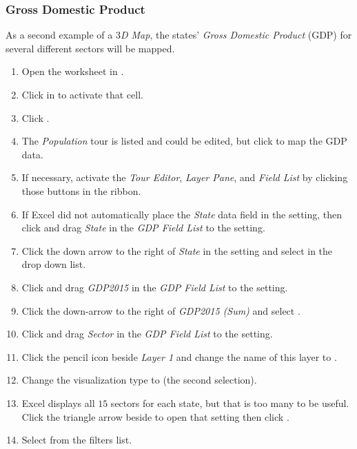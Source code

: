 \subsubsection{Gross Domestic Product}

As a second example of a \textit{$ 3 $D Map}, the states' \textit{Gross Domestic Product} (GDP) for several different sectors will be mapped.

\begin{enumerate}
	\item Open the  worksheet in .
	\item Click in  to activate that cell.
	\item Click .
	\item The \textit{Population} tour is listed and could be edited, but click  to map the GDP data.
	\item If necessary, activate the \textit{Tour Editor}, \textit{Layer Pane}, and \textit{Field List} by clicking those buttons in the ribbon.
	\item If Excel did not automatically place the \textit{State} data field in the  setting, then click and drag \textit{State} in the \textit{GDP Field List} to the  setting. 
	\item Click the down arrow to the right of \textit{State} in the  setting and select  in the drop down list.
	\item Click and drag \textit{GDP2015} in the \textit{GDP Field List} to the  setting.
	\item Click the down-arrow to the right of \textit{GDP2015 (Sum)} and select .
	\item Click and drag \textit{Sector} in the \textit{GDP Field List} to the  setting.
	\item Click the pencil icon beside \textit{Layer 1} and change the name of this layer to .
	\item Change the visualization type to  (the second selection).
	\item Excel displays all $ 15 $ sectors for each state, but that is too many to be useful. Click the triangle arrow beside  to open that setting then click .
	\item Select  from the filters list.

\end{enumerate}
